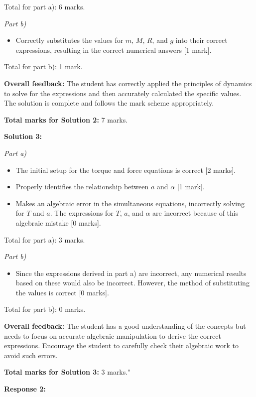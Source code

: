 \documentclass[a4paper,11pt]{article}
\begin{document}
Total for part a): 6 marks.

\textit{Part b)}
\begin{itemize}
    \item Correctly substitutes the values for \( m \), \( M \), \( R \), and \( g \) into their correct expressions, resulting in the correct numerical answers [1 mark].
\end{itemize}

Total for part b): 1 mark.

\textbf{Overall feedback:} The student has correctly applied the principles of dynamics to solve for the expressions and then accurately calculated the specific values. The solution is complete and follows the mark scheme appropriately.

\textbf{Total marks for Solution 2:} 7 marks.

\textbf{Solution 3:}

\textit{Part a)}
\begin{itemize}
    \item The initial setup for the torque and force equations is correct [2 marks].
    \item Properly identifies the relationship between \( a \) and \( \alpha \) [1 mark].
    \item Makes an algebraic error in the simultaneous equations, incorrectly solving for \( T \) and \( a \). The expressions for \( T \), \( a \), and \( \alpha \) are incorrect because of this algebraic mistake [0 marks].
\end{itemize}

Total for part a): 3 marks.

\textit{Part b)}
\begin{itemize}
    \item Since the expressions derived in part a) are incorrect, any numerical results based on these would also be incorrect. However, the method of substituting the values is correct [0 marks].
\end{itemize}

Total for part b): 0 marks.

\textbf{Overall feedback:} The student has a good understanding of the concepts but needs to focus on accurate algebraic manipulation to derive the correct expressions. Encourage the student to carefully check their algebraic work to avoid such errors.

\textbf{Total marks for Solution 3:} 3 marks."

\textbf{Response 2:}
\end{document}
